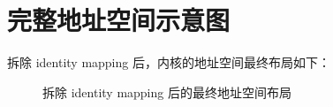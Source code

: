 \section{完整地址空间示意图}

拆除 identity mapping 后，内核的地址空间最终布局如下：

\begin{figure}[H]
  \centering
  
  \caption{拆除 identity mapping 后的最终地址空间布局}
  \label{fig:final-layout}
\end{figure}


